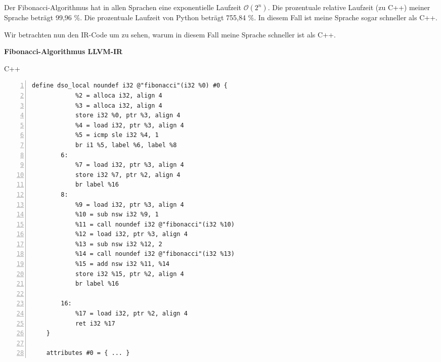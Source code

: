     \begin{adjustwidth}{2.5cm}{-1cm}  %
        
        \begin{minipage}{0.32\textwidth}
        \end{minipage}

    \end{adjustwidth}

    Der Fibonacci-Algorithmus hat in allen Sprachen eine exponentielle Laufzeit \(\mathcal{O}(2^n)\).
    Die prozentuale relative Laufzeit (zu C++) meiner Sprache beträgt 99,96 \%.
    Die prozentuale Laufzeit von Python beträgt 755,84 \%.
    In diesem Fall ist meine Sprache sogar schneller als C++.

    Wir betrachten nun den IR-Code um zu sehen, 
    warum in diesem Fall meine Sprache schneller ist als C++.

    \begin{center}
        \textbf{Fibonacci-Algorithmus LLVM-IR}
    \end{center}

    \begin{center}
        C++
    \end{center}

    \begin{lstlisting}[basicstyle=\tiny, numbers=left]
    define dso_local noundef i32 @"fibonacci"(i32 %0) #0 {
            %2 = alloca i32, align 4
            %3 = alloca i32, align 4
            store i32 %0, ptr %3, align 4
            %4 = load i32, ptr %3, align 4
            %5 = icmp sle i32 %4, 1
            br i1 %5, label %6, label %8
        6:                                                
            %7 = load i32, ptr %3, align 4
            store i32 %7, ptr %2, align 4
            br label %16
        8:                                                
            %9 = load i32, ptr %3, align 4
            %10 = sub nsw i32 %9, 1
            %11 = call noundef i32 @"fibonacci"(i32 %10)
            %12 = load i32, ptr %3, align 4
            %13 = sub nsw i32 %12, 2
            %14 = call noundef i32 @"fibonacci"(i32 %13)
            %15 = add nsw i32 %11, %14
            store i32 %15, ptr %2, align 4
            br label %16

        16:                                              
            %17 = load i32, ptr %2, align 4
            ret i32 %17
    }

    attributes #0 = { ... }

    \end{lstlisting}

